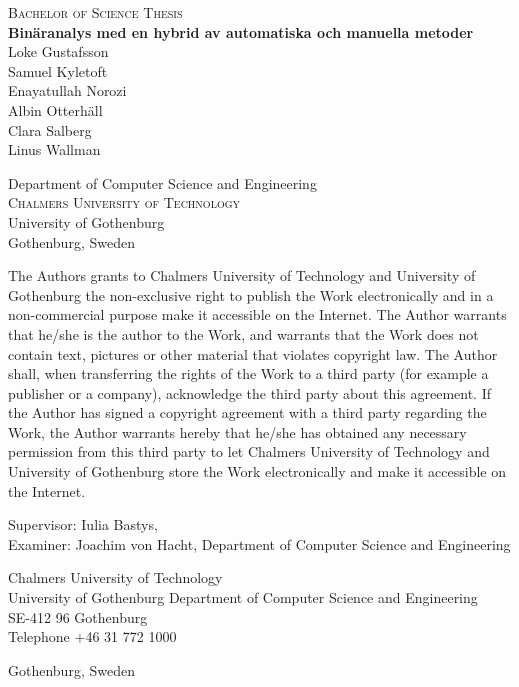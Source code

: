 \newpage
\thispagestyle{empty}
\begin{center}
	
	\textsc{\large Bachelor of Science Thesis }\\[4cm]
	

	\textbf{\Large Binäranalys med en hybrid av automatiska och manuella metoder } \\[1cm]
	{\large Loke Gustafsson} \\
	{\large Samuel Kyletoft} \\
	{\large Enayatullah Norozi} \\
	{\large Albin Otterhäll} \\
	{\large Clara Salberg} \\
	{\large Linus Wallman} \\
	
	\vfill 	

	Department of Computer Science and Engineering\\
	\textsc{Chalmers University of Technology} \\
	{\small University of Gothenburg} \\
	Gothenburg, Sweden \the\year \\
\end{center}


\newpage
{The Authors grants to Chalmers University of Technology and University of Gothenburg the
non-exclusive right to publish the Work electronically and in a non-commercial purpose make it
accessible on the Internet. The Author warrants that he/she is the author to the Work, and
warrants that the Work does not contain text, pictures or other material that violates
copyright law.
The Author shall, when transferring the rights of the Work to a third party (for example a
publisher or a company), acknowledge the third party about this agreement. If the Author has
signed a copyright agreement with a third party regarding the Work, the Author warrants
hereby that he/she has obtained any necessary permission from this third party to let Chalmers
University of Technology and University of Gothenburg store the Work electronically and make
it accessible on the Internet.}

Supervisor: Iulia Bastys, \\
Examiner: Joachim von Hacht, Department of Computer Science and Engineering\setlength{\parskip}{1cm}

Chalmers University of Technology\\
University of Gothenburg
Department of Computer Science and Engineering \\
SE-412 96 Gothenburg\\
Telephone +46 31 772 1000 \setlength{\parskip}{0.5cm}

\vfill
Gothenburg, Sweden \the\year
